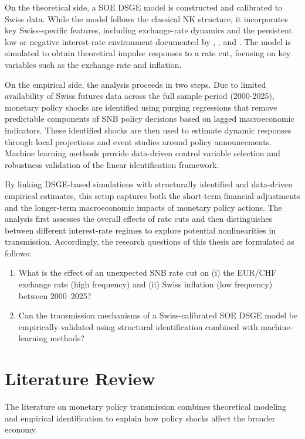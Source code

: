 \documentclass[12pt,a4paper]{article}
\begin{document}
On the theoretical side, a SOE DSGE model is constructed and calibrated to Swiss data. While the model follows the classical NK structure, it incorporates key Swiss-specific features, including exchange-rate dynamics and the persistent low or negative interest-rate environment documented by \citet{cuchecurti2009}, \citet{baurle2014}, and \citet{rudolf2014}. The model is simulated to obtain theoretical impulse responses to a rate cut, focusing on key variables such as the exchange rate and inflation.

On the empirical side, the analysis proceeds in two steps. Due to limited availability of Swiss futures data across the full sample period (2000-2025), monetary policy shocks are identified using purging regressions that remove predictable components of SNB policy decisions based on lagged macroeconomic indicators. These identified shocks are then used to estimate dynamic responses through local projections and event studies around policy announcements. Machine learning methods provide data-driven control variable selection and robustness validation of the linear identification framework.

By linking DSGE-based simulations with structurally identified and data-driven empirical estimates, this setup captures both the short-term financial adjustments and the longer-term macroeconomic impacts of monetary policy actions. The analysis first assesses the overall effects of rate cuts and then distinguishes between different interest-rate regimes to explore potential nonlinearities in transmission.
Accordingly, the research questions of this thesis are formulated as follows:

\begin{enumerate}[label=\textbf{RQ\arabic*:}, leftmargin=*, itemsep=0.4em, font=\normalfont]
	\item What is the effect of an unexpected SNB rate cut on (i) the EUR/CHF exchange rate (high frequency) and (ii) Swiss inflation (low frequency) between 2000–2025?
	\item Can the transmission mechanisms of a Swiss-calibrated SOE DSGE model be empirically validated using structural identification combined 
	with machine-learning methods?
\end{enumerate}

\section{Literature Review}
\label{sec:lit}
The literature on monetary policy transmission combines theoretical modeling and empirical identification to explain how policy shocks affect the broader economy.  
\end{document}
